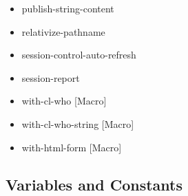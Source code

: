 \documentclass [11pt]{book}
\begin{document}
\begin{itemize}
\item {}publish-string-content





\item {}relativize-pathname





\item {}session-control-auto-refresh





\item {}session-report





\item {}with-cl-who [Macro]





\item {}with-cl-who-string [Macro]





\item {}with-html-form [Macro]





\end{itemize}



\subsection{Variables and Constants}

\label{subsec:variablesandconstants}
\end{document}
